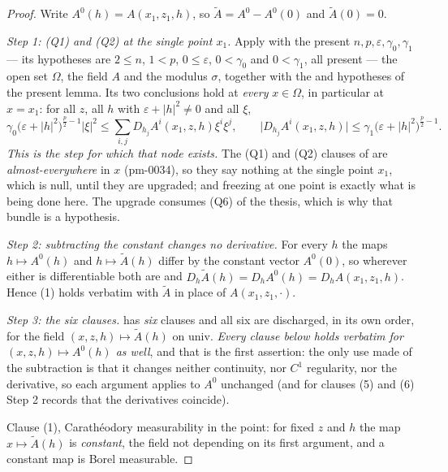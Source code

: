 \begin{proof}
Write $A^0(h)=A(x_1,z_1,h)$, so $\widetilde A=A^0-A^0(0)$ and
$\widetilde A(0)=0$.

\emph{Step 1: \textup{(Q1)} and \textup{(Q2)} at the single point $x_1$.}  Apply
 with the present
$n,p,\varepsilon,\gamma_0,\gamma_1$ --- its hypotheses are $2\le n$, $1<p$,
$0\le\varepsilon$, $0<\gamma_0$ and $0<\gamma_1$, all present --- the open set
$\Omega$, the field $A$ and the modulus $\sigma$, together with the
 and  hypotheses of
the present lemma.  Its two conclusions hold at \emph{every} $x\in\Omega$, in
particular at $x=x_1$: for all $z$, all $h$ with $\varepsilon+|h|^2\ne0$ and all
$\xi$,
\[
\gamma_0\bigl(\varepsilon+|h|^2\bigr)^{\frac p2-1}|\xi|^2
\le\sum_{i,j}D_{h_j}A^i(x_1,z,h)\xi^i\xi^j ,
\qquad
\bigl|D_{h_j}A^i(x_1,z,h)\bigr|
\le\gamma_1\bigl(\varepsilon+|h|^2\bigr)^{\frac p2-1}.
\tag{1}
\]
\emph{This is the step for which that node exists.}  The (Q1) and (Q2) clauses
of  are \emph{almost-everywhere} in $x$
(pm-0034), so they say nothing at the single point $x_1$, which is null, until
they are upgraded; and freezing at one point is exactly what is being done here.
The upgrade consumes (Q6) of the thesis, which is why that bundle is a hypothesis.

\emph{Step 2: subtracting the constant changes no derivative.}  For every $h$
the maps $h\mapsto A^0(h)$ and $h\mapsto\widetilde A(h)$ differ by the constant
vector $A^0(0)$, so wherever either is differentiable both are and
$D_h\widetilde A(h)=D_hA^0(h)=D_{h}A(x_1,z_1,h)$.  Hence (1) holds verbatim with
$\widetilde A$ in place of $A(x_1,z_1,\cdot)$.

\emph{Step 3: the six clauses.}   has \emph{six}
clauses and all six are discharged, in its own order, for the field
$(x,z,h)\mapsto\widetilde A(h)$ on $\mathrm{univ}$.  \emph{Every clause below
holds verbatim for $(x,z,h)\mapsto A^0(h)$ as well}, and that is the first
assertion: the only use made of the subtraction is that it changes neither
continuity, nor $C^1$ regularity, nor the derivative, so each argument applies
to $A^0$ unchanged (and for clauses (5) and (6) Step 2 records that the
derivatives coincide).

Clause (1), Carath\'eodory measurability in the point: for fixed $z$ and $h$ the
map $x\mapsto\widetilde A(h)$ is \emph{constant}, the field not depending on its
first argument, and a constant map is Borel measurable.


\end{proof}
